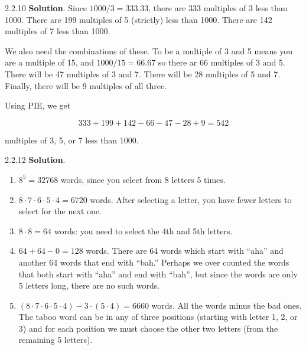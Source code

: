 \documentclass[11pt,]{book}
\theoremstyle{ptxplainnotitle}
\theoremstyle{ptxplaintitle}
\theoremstyle{ptxdefinitionnotitle}
\theoremstyle{ptxdefinitiontitle}
\theoremstyle{ptxdefinitionnotitle}
\theoremstyle{ptxdefinitiontitle}
\theoremstyle{ptxdefinitionnotitle}
\theoremstyle{ptxdefinitiontitle}
\theoremstyle{ptxdefinitiontitlenonumber}
\theoremstyle{ptxdefinitiontitlenonumber}
\numberwithin{equation}{chapter}
\begin{document}
\begin{divisionexercise}{2.2.10}
\textbf{Solution}.\quad%
\hypertarget{p-1137}{}%
Since \(1000/3 = 333.33\text{,}\) there are 333 multiples of 3 less than 1000.  There are 199 multiples of 5 (strictly) less than 1000.  There are 142 multiples of 7 less than 1000.%
\par
\hypertarget{p-1138}{}%
We also need the combinations of these.  To be a multiple of 3 and 5 means you are a multiple of 15, and \(1000/15 = 66.67\) so there ar 66 multiples of 3 and 5.  There will be 47 multiples of 3 and 7.  There will be 28 multiples of 5 and 7.  Finally, there will be 9 multiples of all three.%
\par
\hypertarget{p-1139}{}%
Using PIE, we get%
\par
\hypertarget{p-1140}{}%
%
\begin{equation*}
333+199 + 142 - 66 - 47 - 28 + 9 = 542
\end{equation*}
%
\par
\hypertarget{p-1141}{}%
multiples of 3, 5, or 7 less than 1000.%
\end{divisionexercise}%
\begin{divisionexercise}{2.2.12}
\textbf{Solution}.\quad%
\hypertarget{p-1167}{}%
\leavevmode%
\begin{enumerate}[label=\alph*.]
\item\hypertarget{li-505}{}\hypertarget{p-1168}{}%
\(8^5 = 32768\) words, since you select from 8 letters 5 times.%
\item\hypertarget{li-506}{}\hypertarget{p-1169}{}%
\(8\cdot 7\cdot 6\cdot 5\cdot 4 = 6720\) words. After selecting a letter, you have fewer letters to select for the next one.%
\item\hypertarget{li-507}{}\hypertarget{p-1170}{}%
\(8 \cdot 8 =64\) words: you need to select the 4th and 5th letters.%
\item\hypertarget{li-508}{}\hypertarget{p-1171}{}%
\(64 + 64 - 0 = 128\) words. There are 64 words which start with ``aha'' and another 64 words that end with ``bah.'' Perhaps we over counted the words that both start with ``aha'' and end with ``bah'', but since the words are only 5 letters long, there are no such words.%
\item\hypertarget{li-509}{}\hypertarget{p-1172}{}%
\((8\cdot 7\cdot 6\cdot 5\cdot 4) - 3\cdot (5\cdot 4) = 6660\) words. All the words minus the bad ones. The taboo word can be in any of three positions (starting with letter 1, 2, or 3) and for each position we must choose the other two letters (from the remaining 5 letters).%
\end{enumerate}
%
\end{divisionexercise}%
\end{document}
